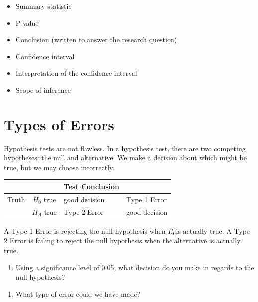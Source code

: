 \documentclass[
]{report}
\providecommand{\tightlist}{%
  \setlength{\itemsep}{0pt}\setlength{\parskip}{0pt}}
\begin{document}
\begin{itemize}
\item
  Summary statistic
\item
  P-value
\item
  Conclusion (written to answer the research question)
\item
  Confidence interval
\item
  Interpretation of the confidence interval
\item
  Scope of inference
\end{itemize}

\vspace{3in}

\hypertarget{types-of-errors}{%
\section{Types of Errors}\label{types-of-errors}}

Hypothesis tests are not flawless. In a hypothesis test, there are two competing hypotheses: the null and alternative. We make a decision about which might be true, but we may choose incorrectly.

\begin{longtable}[]{@{}ccll@{}}
\toprule
& & Test Conclusion &\tabularnewline
\midrule
\endhead
Truth & \(H_0\) true & good decision & Type 1 Error\tabularnewline
& \(H_A\) true & Type 2 Error & good decision\tabularnewline
\bottomrule
\end{longtable}

A Type 1 Error is rejecting the null hypothesis when \(H_0\)is actually true. A Type 2 Error is failing to reject the null hypothesis when the alternative is actually true.

\begin{enumerate}
\def\labelenumi{\arabic{enumi}.}
\setcounter{enumi}{25}
\tightlist
\item
  Using a significance level of 0.05, what decision do you make in regards to the null hypothesis?
\end{enumerate}

\vspace{0.5in}

\begin{enumerate}
\def\labelenumi{\arabic{enumi}.}
\setcounter{enumi}{26}
\tightlist
\item
  What type of error could we have made?
\end{enumerate}

\vspace{0.5in}
\end{document}

